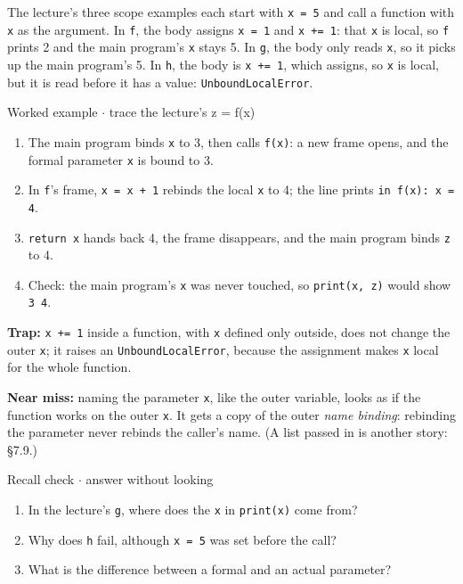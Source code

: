 \documentclass[11pt]{article}
\begin{document}
\begin{keepsection}
The lecture’s three scope examples each start with \texttt{x = 5} and call a function with \texttt{x} as the argument. In \texttt{f}, the body assigns \texttt{x = 1} and \texttt{x += 1}: that \texttt{x} is local, so \texttt{f} prints 2 and the main program’s \texttt{x} stays 5. In \texttt{g}, the body only reads \texttt{x}, so it picks up the main program’s 5. In \texttt{h}, the body is \texttt{x += 1}, which assigns, so \texttt{x} is local, but it is read before it has a value: \texttt{UnboundLocalError}.

\begin{workedbox}{Worked example \ensuremath{\cdot} trace the lecture’s z = f(x)}
\begin{enumerate}
\item The main program binds \texttt{x} to 3, then calls \texttt{f(x)}: a new frame opens, and the formal parameter \texttt{x} is bound to 3.
\item In \texttt{f}’s frame, \texttt{x = x + 1} rebinds the local \texttt{x} to 4; the line prints \texttt{in f(x): x = 4}.
\item \texttt{return x} hands back 4, the frame disappears, and the main program binds \texttt{z} to 4.
\item Check: the main program’s \texttt{x} was never touched, so \texttt{print(x, z)} would show \texttt{3 4}.
\end{enumerate}
\end{workedbox}

\begin{notebox}\textbf{Trap:} \texttt{x += 1} inside a function, with \texttt{x} defined only outside, does not change the outer \texttt{x}; it raises an \texttt{UnboundLocalError}, because the assignment makes \texttt{x} local for the whole function.\end{notebox}

\begin{notebox}\textbf{Near miss:} naming the parameter \texttt{x}, like the outer variable, looks as if the function works on the outer \texttt{x}. It gets a copy of the outer \emph{name binding}: rebinding the parameter never rebinds the caller’s name. (A list passed in is another story: §7.9.)\end{notebox}

\begin{recallbox}{Recall check \ensuremath{\cdot} answer without looking}
\begin{enumerate}
\item In the lecture’s \texttt{g}, where does the \texttt{x} in \texttt{print(x)} come from?
\item Why does \texttt{h} fail, although \texttt{x = 5} was set before the call?
\item What is the difference between a formal and an actual parameter?
\end{enumerate}

\end{recallbox}
\end{keepsection}
\end{document}
